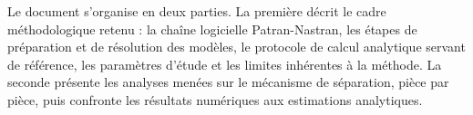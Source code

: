 Le document s'organise en deux parties. La première décrit le cadre méthodologique retenu :
la chaîne logicielle Patran-Nastran, les étapes de préparation et de résolution des modèles,
le protocole de calcul analytique servant de référence, les paramètres d'étude et les limites
inhérentes à la méthode. La seconde présente les analyses menées sur le mécanisme de
séparation, pièce par pièce, puis confronte les résultats numériques aux estimations
analytiques.

\newpage